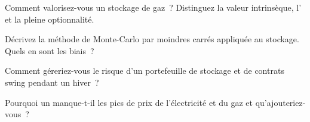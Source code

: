 \begin{interviewq}\label{iq:rc:commodity-and-energy-derivatives:3}
Comment valorisez-vous un stockage de gaz~? Distinguez la valeur intrinsèque, l'
et la pleine optionnalité.
\end{interviewq}

\begin{interviewq}\label{iq:rc:commodity-and-energy-derivatives:4}
Décrivez la méthode de Monte-Carlo par moindres carrés appliquée au stockage. Quels en sont les biais~?
\end{interviewq}

\begin{interviewq}\label{iq:rc:commodity-and-energy-derivatives:5}
Comment géreriez-vous le risque d'un portefeuille de stockage et de contrats swing pendant un hiver~?
\end{interviewq}

\begin{interviewq}\label{iq:rc:commodity-and-energy-derivatives:6}
Pourquoi un  manque-t-il les pics de prix de l'électricité et du gaz
et qu'ajouteriez-vous~?
\end{interviewq}
